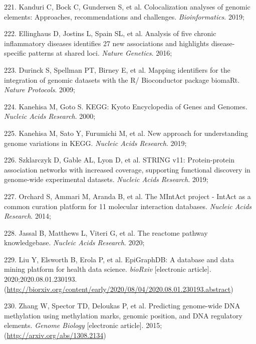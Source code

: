 \documentclass[11pt,twoside]{bristolthesis}
\newenvironment{cslreferences}%
  {}%
  {\par}
\begin{document}
\begin{cslreferences}
\leavevmode\hypertarget{ref-Kanduri2019}{}%
221. Kanduri C, Bock C, Gundersen S, et al. Colocalization analyses of genomic elements: Approaches, recommendations and challenges. \emph{Bioinformatics}. 2019;

\leavevmode\hypertarget{ref-Ellinghaus2016}{}%
222. Ellinghaus D, Jostins L, Spain SL, et al. Analysis of five chronic inflammatory diseases identifies 27 new associations and highlights disease-specific patterns at shared loci. \emph{Nature Genetics}. 2016;

\leavevmode\hypertarget{ref-Durinck2009}{}%
223. Durinck S, Spellman PT, Birney E, et al. Mapping identifiers for the integration of genomic datasets with the R/ Bioconductor package biomaRt. \emph{Nature Protocols}. 2009;

\leavevmode\hypertarget{ref-Kanehisa2000}{}%
224. Kanehisa M, Goto S. KEGG: Kyoto Encyclopedia of Genes and Genomes. \emph{Nucleic Acids Research}. 2000;

\leavevmode\hypertarget{ref-Kanehisa2019}{}%
225. Kanehisa M, Sato Y, Furumichi M, et al. New approach for understanding genome variations in KEGG. \emph{Nucleic Acids Research}. 2019;

\leavevmode\hypertarget{ref-Szklarczyk2019}{}%
226. Szklarczyk D, Gable AL, Lyon D, et al. STRING v11: Protein-protein association networks with increased coverage, supporting functional discovery in genome-wide experimental datasets. \emph{Nucleic Acids Research}. 2019;

\leavevmode\hypertarget{ref-Orchard2014}{}%
227. Orchard S, Ammari M, Aranda B, et al. The MIntAct project - IntAct as a common curation platform for 11 molecular interaction databases. \emph{Nucleic Acids Research}. 2014;

\leavevmode\hypertarget{ref-Jassal2020}{}%
228. Jassal B, Matthews L, Viteri G, et al. The reactome pathway knowledgebase. \emph{Nucleic Acids Research}. 2020;

\leavevmode\hypertarget{ref-Liu2020}{}%
229. Liu Y, Elsworth B, Erola P, et al. EpiGraphDB: A database and data mining platform for health data science. \emph{bioRxiv} {[}electronic article{]}. 2020;2020.08.01.230193. (\url{http://biorxiv.org/content/early/2020/08/04/2020.08.01.230193.abstract})

\leavevmode\hypertarget{ref-Zhang2015}{}%
230. Zhang W, Spector TD, Deloukas P, et al. Predicting genome-wide DNA methylation using methylation marks, genomic position, and DNA regulatory elements. \emph{Genome Biology} {[}electronic article{]}. 2015;(\url{http://arxiv.org/abs/1308.2134})


\end{cslreferences}
\end{document}
